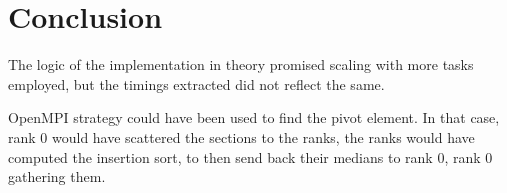 \documentclass[11pt]{article}
\begin{document}
\section{Conclusion}

The logic of the implementation in theory promised scaling with more tasks employed, but the timings extracted did not reflect the same.

OpenMPI strategy could have been used to find the pivot element. In that case, rank 0 would have scattered the sections to the ranks, the ranks would have computed the insertion sort, to then send back their medians to rank 0, rank 0 gathering them.
\end{document}
